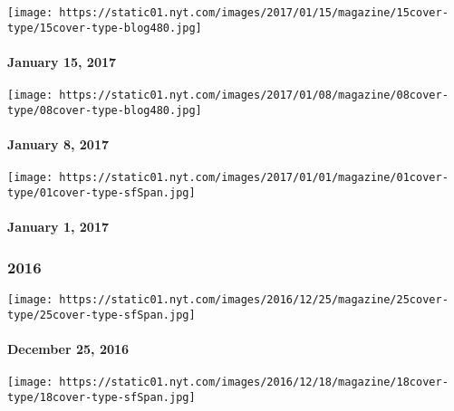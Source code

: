 \href{http://www.nytimes.com/issue/magazine/2017/01/15/magazine-index}{}

\texttt{[image: https://static01.nyt.com/images/2017/01/15/magazine/15cover-type/15cover-type-blog480.jpg]}

\hypertarget{january-15-2017}{%
\paragraph{January 15, 2017}\label{january-15-2017}}

\href{http://www.nytimes.com/issue/magazine/2017/01/08/magazine-index-2}{}

\texttt{[image: https://static01.nyt.com/images/2017/01/08/magazine/08cover-type/08cover-type-blog480.jpg]}

\hypertarget{january-8-2017}{%
\paragraph{January 8, 2017}\label{january-8-2017}}

\href{http://www.nytimes.com/indexes/2017/01/01/magazine/index.html}{}

\texttt{[image: https://static01.nyt.com/images/2017/01/01/magazine/01cover-type/01cover-type-sfSpan.jpg]}

\hypertarget{january-1-2017}{%
\paragraph{January 1, 2017}\label{january-1-2017}}

\hypertarget{2016}{%
\subsubsection{2016}\label{2016}}

\href{http://www.nytimes.com/indexes/2016/12/25/magazine/index.html}{}

\texttt{[image: https://static01.nyt.com/images/2016/12/25/magazine/25cover-type/25cover-type-sfSpan.jpg]}

\hypertarget{december-25-2016}{%
\paragraph{December 25, 2016}\label{december-25-2016}}

\href{http://www.nytimes.com/indexes/2016/12/18/magazine/index.html}{}

\texttt{[image: https://static01.nyt.com/images/2016/12/18/magazine/18cover-type/18cover-type-sfSpan.jpg]}


